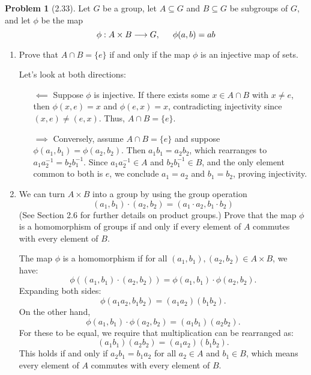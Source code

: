 \documentclass[12pt]{article}
\theoremstyle{definition}
\newtheorem{problem}{Problem}
\begin{document}
\begin{problem}[2.33]
    Let $G$ be a group, let $A \subseteq G$ and $B \subseteq G$ be subgroups of $G$, and let $\phi$ be the map
    \[\phi : A \times B \longrightarrow G, \hspace{15px} \phi(a, b) = ab\]
    \begin{enumerate}[label=(\alph*)]
        \item Prove that $A \cap B = \{e\}$ if and only if the map $\phi$ is an injective map of sets.
        
        \begin{solution}
            Let's look at both directions:
            \begin{itemize}
                \item[$\impliedby$] Suppose $\phi$ is injective. If there exists some $x \in A \cap B$ with $x \neq e$, then $\phi(x, e) = x$ and $\phi(e, x) = x$, contradicting injectivity since $(x, e) \neq (e, x)$. Thus, $A \cap B = \{e\}$.
                \item[$\implies$] Conversely, assume $A \cap B = \{e\}$ and suppose $\phi(a_1, b_1) = \phi(a_2, b_2)$. Then $a_1 b_1 = a_2 b_2$, which rearranges to $a_1 a_2^{-1} = b_2 b_1^{-1}$. Since $a_1 a_2^{-1} \in A$ and $b_2 b_1^{-1} \in B$, and the only element common to both is $e$, we conclude $a_1 = a_2$ and $b_1 = b_2$, proving injectivity.
            \end{itemize}
        \end{solution}
        \item We can turn $A \times B$ into a group by using the group operation
              \[(a_1, b_1) \cdot (a_2, b_2) = (a_1 \cdot a_2, b_1 \cdot b_2)\]
              (See Section 2.6 for further details on product groups.) Prove that the map $\phi$ is a homomorphism of groups 
              if and only if every element of $A$ commutes with every element of $B$.
        
        \begin{solution}
            The map $\phi$ is a homomorphism if for all $(a_1, b_1), (a_2, b_2) \in A \times B$, we have:
            \[ \phi((a_1, b_1) \cdot (a_2, b_2)) = \phi(a_1, b_1) \cdot \phi(a_2, b_2). \]
            Expanding both sides:
            \[ \phi(a_1 a_2, b_1 b_2) = (a_1 a_2)(b_1 b_2). \]
            On the other hand,
            \[ \phi(a_1, b_1) \cdot \phi(a_2, b_2) = (a_1 b_1)(a_2 b_2). \]
            For these to be equal, we require that multiplication can be rearranged as:
            \[ (a_1 b_1)(a_2 b_2) = (a_1 a_2)(b_1 b_2). \]
            This holds if and only if $a_2 b_1 = b_1 a_2$ for all $a_2 \in A$ and $b_1 \in B$, which means every element of $A$ commutes with every element of $B$.
        
        \end{solution}
    \end{enumerate}
\end{problem}
\end{document}
